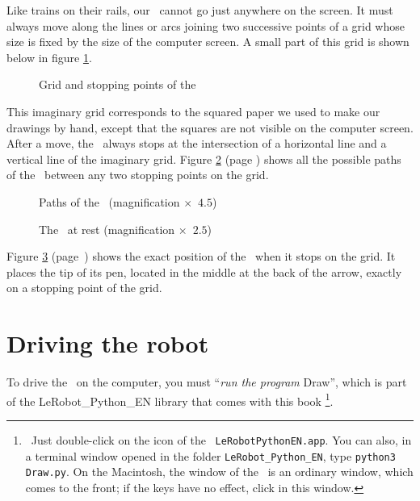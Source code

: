 \smallskip

Like trains on their rails, our \robot\ cannot go
just anywhere on the screen. It must always move along
the lines or arcs joining two successive points of a grid whose size is
fixed by the size of the computer screen. A small part of this grid
is shown \hbox{below} in figure \ref{fig:grille}.
%
\begin{figure}[htbp]
 \caption{Grid and stopping points of the \protect\robot}
 \label{fig:grille}
\end{figure}

\noindent This imaginary grid corresponds to the squared paper we used to
make our drawings by hand, except that the squares are not visible on
the computer screen.
After a move, the \robot\ always stops at the intersection
of a horizontal line and a vertical line of the imaginary grid. Figure
 \ref{fig:traject} (page \pageref{fig:traject}) shows all the possible paths
of the \robot\ between any two stopping points on the grid.
\begin{figure}[htbp]
 \caption{Paths of the \protect\robot\ (magnification $\times$\ $4.5$)}
 \label{fig:traject}
\end{figure}
\begin{figure}[htbp]
 \caption{The \protect\robot\ at rest (magnification $\times$\ $2.5$)}
 \label{fig:robot-arrete}
\end{figure}
Figure \ref{fig:robot-arrete} \hbox{(page \pageref{fig:robot-arrete})}
shows the exact
position of the \robot\ when it stops on the grid. It places the tip of
its pen, located in the middle at the back of the arrow, exactly on
a stopping point of the grid.


\section{Driving the robot}

To drive the \robot\ on the computer, you must ``{\em run the program}
{\idt Draw}'', which is part of the {\idt LeRobot\_Python\_EN} library
that comes with this book%
\footnote{\ Just double-click on the icon of the \robot\ {\tt LeRobotPythonEN.app}.
You can also, in a terminal window opened in the folder
{\tt LeRobot\_Python\_EN}, type
{\tt python3 Draw.py}. On the Macintosh, the window of the \robot\ is an
ordinary window, which comes to the front; if the keys have no effect, click
in this window.}.

